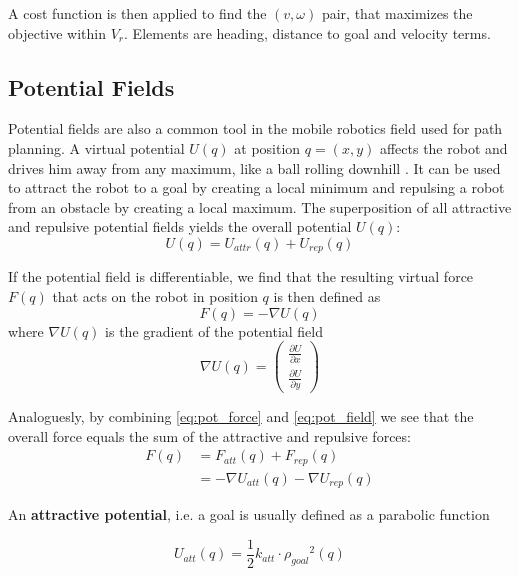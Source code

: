 A cost function is then applied to find the $(v,\omega)$ pair, that maximizes the objective within $V_r$. Elements are heading, distance to goal and velocity terms.

\subsection{Potential Fields}
	\label{sec:pot_field}
Potential fields are also a common tool in the mobile robotics field used for path planning. A virtual potential $U(q)$ at position $q = (x,y)$ affects the robot and drives him away from any maximum, like a ball rolling downhill \citep{siegwart2004autonomous}. It can be used to attract the robot to a goal by creating a local minimum and repulsing a robot from an obstacle by creating a local maximum. The superposition of all attractive and repulsive potential fields yields the overall potential $U(q)$:
\begin{equation}
U(q) = U_{attr}(q) + U_{rep}(q)
	\label{eq:pot_field}
\end{equation}

If the potential field is differentiable, we find that the resulting virtual force $F(q)$ that acts on the robot in position $q$ is then defined as 
\begin{equation}
F(q) = - \nabla U(q) 
	\label{eq:pot_force}
\end{equation}
where $\nabla U(q)$ is the gradient of the potential field
\begin{equation}
\nabla U(q) = \begin{pmatrix}
\frac{\partial U}{\partial x} \\
\frac{\partial U}{\partial y}
\end{pmatrix}
	\label{eq:gradient}
\end{equation}

Analoguesly, by combining \ref{eq:pot_force} and \ref{eq:pot_field} we see that the overall force equals the sum of the attractive and repulsive forces:
\begin{equation}
\begin{aligned}
F(q) &= F_{att}(q) + F_{rep}(q) \\
&= -\nabla U_{att}(q)-\nabla U_{rep}(q)
\end{aligned}
\end{equation}


An \textbf{attractive potential}, i.e. a goal is usually defined as a parabolic function

\begin{equation}
U_{att}(q) = \frac{1}{2} k_{att} \cdot {\rho_{goal}}^2(q)
\end{equation}

